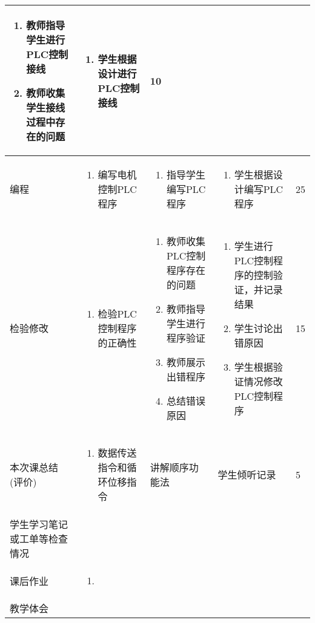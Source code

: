 {\begin{landscape}
\begin{longtable}{|m{10mm}|m{50mm}|m{50mm}|m{50mm}|m{15mm}|}
\begin{enumerate}
\item 教师指导学生进行PLC控制接线
\item 教师收集学生接线过程中存在的问题
\end{enumerate} &\begin{enumerate}
\item 学生根据设计进行PLC控制接线
\end{enumerate} &10 \\\hline
编程&
\begin{enumerate}
\item 编写电机控制PLC程序
\end{enumerate} &\begin{enumerate}
\item 指导学生编写PLC程序
\end{enumerate} &\begin{enumerate}
\item 学生根据设计编写PLC程序
\end{enumerate} &25 \\\hline
\centering 检验修改&\begin{enumerate}
\item 检验PLC控制程序的正确性
\end{enumerate}&\begin{enumerate}
\item 教师收集PLC控制程序存在的问题
\item 教师指导学生进行程序验证
\item 教师展示出错程序
\item 总结错误原因
\end{enumerate}&\begin{enumerate}
\item 学生进行PLC控制程序的控制验证，并记录结果
\item 学生讨论出错原因
\item 学生根据验证情况修改PLC控制程序
\end{enumerate}&15 \\\hline
\centering 本次课总结(评价)&\begin{enumerate}
\item 数据传送指令和循环位移指令 
\end{enumerate}&讲解顺序功能法  &学生倾听记录 &5 \\\hline
\centering 学生学习笔记或工单等检查情况&\multicolumn{4}{m{165mm}|}{\quad}\\\hline
\centering 课后作业&\multicolumn{4}{m{165mm}|}{\begin{enumerate}
\item 
\end{enumerate}}\\\hline
\centering 教学体会&\multicolumn{4}{m{165mm}|}{\quad}\\
\end{longtable}


\end{landscape}}
